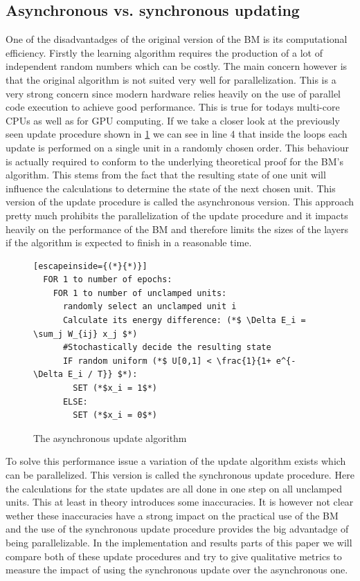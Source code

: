 \documentclass[12pt,twoside]{article}
\theoremstyle{plain}
\theoremstyle{definition}
\theoremstyle{remark}
\begin{document}
\subsection{Asynchronous vs. synchronous updating}
\label{subsec:updating-procedures}

One of the disadvantadges of the original version of the BM is its computational efficiency.
Firstly the learning algorithm requires the production of a lot of independent random numbers which can be costly.
The main concern however is that the original algorithm is not suited very well for parallelization.
This is a very strong concern since modern hardware relies heavily on the use of parallel code execution to
achieve good performance. This is true for todays multi-core CPUs as well as for GPU computing.
If we take a closer look at the previously seen update procedure shown in \cref{fig:update-alg}
we can see in line 4 that inside the loops each update is performed on a single unit in a randomly chosen
order. This behaviour is actually required to conform to the underlying theoretical proof for the BM's
algorithm. This stems from the fact that the resulting state of one unit will influence the calculations to
determine the state of the next chosen unit. This version of the update procedure is called the asynchronous version.
This approach pretty much prohibits the parallelization of the update procedure and it impacts heavily on the performance
of the BM and therefore limits the sizes of the layers if the algorithm is expected to finish in a reasonable time.

\begin{figure}[h]
\begin{lstlisting}[escapeinside={(*}{*)}]
  FOR 1 to number of epochs:
    FOR 1 to number of unclamped units:
      randomly select an unclamped unit i
      Calculate its energy difference: (*$ \Delta E_i = \sum_j W_{ij} x_j $*)
      #Stochastically decide the resulting state
      IF random uniform (*$ U[0,1] < \frac{1}{1+ e^{- \Delta E_i / T}} $*):
        SET (*$x_i = 1$*)
      ELSE:
        SET (*$x_i = 0$*)
\end{lstlisting}
\caption{The asynchronous update algorithm}
\label{fig:update-alg}
\end{figure}

To solve this performance issue a variation of the update algorithm exists which can be parallelized.
This version is called the synchronous update procedure. Here the calculations for the state updates are
all done in one step on all unclamped units. This at least in theory introduces some inaccuracies.
It is however not clear wether these inaccuracies have a strong impact on the practical use of the
BM and the use of the synchronous update procedure provides the big advantadge of
being parallelizable. In the implementation and results parts of this paper we will
compare both of these update procedures and try to give qualitative metrics to measure
the impact of using the synchronous update over the asynchronous one.
\end{document}
